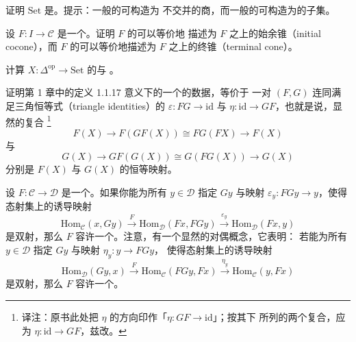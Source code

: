 \begin{exercise}\label{ex:set-bicomplete}
证明\trCategory{} $\mathrm{Set}$ 是\trBicomplete{}。提示：一般的\trColimit{}可构造为
不交并的商，而一般的\trLimit{}可构造为\trProduct{}的子集。
\end{exercise}

\begin{exercise}\label{ex:colimit-initial-cocone}
设 $F\colon I \to \mathcal{C}$ 是一个\trFunctor{}。证明 $F$ 的\trColimit{}可以等价地
描述为 $F$ 之上的始余锥（initial cocone），而 $F$ 的\trLimit{}可以等价地描述为
$F$ 之上的终锥（terminal cone）。
\end{exercise}

\begin{exercise}\label{ex:limit-colimit-simplicial-set}
计算\trSimplicialSet{} $X\colon \Delta^{\mathrm{op}} \to \mathrm{Set}$ 的\trLimit{}与%
\trColimit{}。
\end{exercise}

\begin{exercise}\label{ex:adjunction-unit-counit}
证明第 1 章中的定义 1.1.17 意义下的一个\trAdjunction{}的数据，等价于
一对\trFunctor{} $(F, G)$ 连同满足三角恒等式（triangle identities）的%
\trNaturalTransformation{} $\varepsilon\colon FG \to \mathrm{id}$ 与
$\eta\colon \mathrm{id} \to GF$，也就是说，显然的复合%
\footnote{译注：原书此处把 $\eta$ 的方向印作「$\eta\colon GF \to \mathrm{id}$」；按其下
所列的两个复合，应为 $\eta\colon \mathrm{id} \to GF$，兹改。}
\[
F(X) \to F(GF(X)) \cong FG(FX) \to F(X)
\]
与
\[
G(X) \to GF(G(X)) \cong G(FG(X)) \to G(X)
\]
分别是 $F(X)$ 与 $G(X)$ 的恒等映射。
\end{exercise}

\begin{exercise}\label{ex:adjoint-via-hom-bijection}
设 $F\colon \mathcal{C} \to \mathcal{D}$ 是一个\trFunctor{}。如果你能为所有
$y \in \mathcal{D}$ 指定\trObject{} $Gy$ 与映射 $\varepsilon_y\colon FGy \to y$，使得
态射集上的诱导映射
\[
\mathrm{Hom}_{\mathcal{C}}(x, Gy)
\xrightarrow{\ F\ }
\mathrm{Hom}_{\mathcal{D}}(Fx, FGy)
\xrightarrow{\ \varepsilon_y\ }
\mathrm{Hom}_{\mathcal{D}}(Fx, y)
\]
是双射，那么 $F$ 容许一个\trRightAdjoint{}。注意，有一个显然的对偶概念，它表明：
若能为所有 $y \in \mathcal{D}$ 指定\trObject{} $Gy$ 与映射 $\eta_y\colon y \to FGy$，
使得态射集上的诱导映射
\[
\mathrm{Hom}_{\mathcal{D}}(Gy, x)
\xrightarrow{\ F\ }
\mathrm{Hom}_{\mathcal{C}}(FGy, Fx)
\xrightarrow{\ \eta_y\ }
\mathrm{Hom}_{\mathcal{C}}(y, Fx)
\]
是双射，那么 $F$ 容许一个\trLeftAdjoint{}。
\end{exercise}

